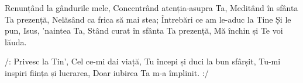 \beginverse
Renunțând la gândurile mele,
Concentrând atenția-asupra Ta,
Meditând în sfânta Ta prezență,
Nelăsând ca frica să mai stea;
Întrebări ce am le-aduc la Tine
Și le pun, Isus, ’naintea Ta,
Stând curat în sfânta Ta prezență,
Mă închin și Te voi lăuda.
\endverse

\beginchorus
/: Privesc la Tin’, Cel ce-mi dai viață,
Tu începi și duci la bun sfârșit,
Tu-mi inspiri ființa și lucrarea,
Doar iubirea Ta m-a împlinit. :/
\endchorus
\endsong